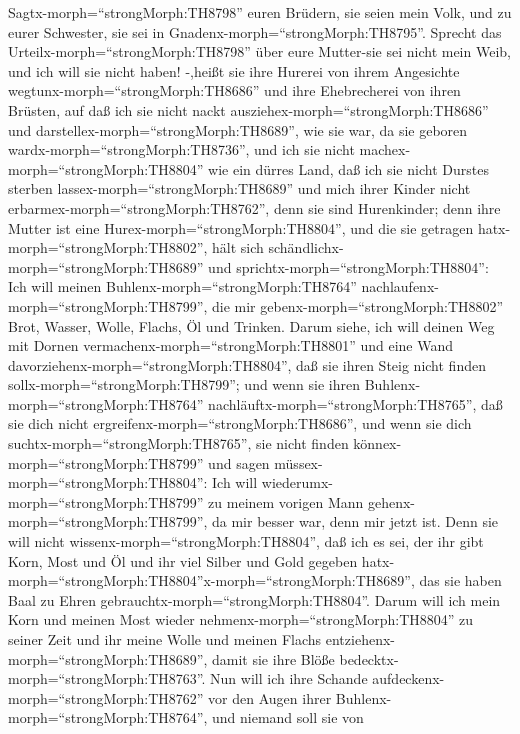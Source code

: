  Sagtx-morph=``strongMorph:TH8798'' euren Brüdern, sie seien
mein Volk, und zu eurer Schwester, sie sei in
Gnadenx-morph=``strongMorph:TH8795''.  Sprecht das
Urteilx-morph=``strongMorph:TH8798'' über eure Mutter-sie sei nicht mein
Weib, und ich will sie nicht haben! -,heißt sie ihre Hurerei von ihrem
Angesichte wegtunx-morph=``strongMorph:TH8686'' und ihre Ehebrecherei
von ihren Brüsten,  auf daß ich sie nicht nackt
ausziehex-morph=``strongMorph:TH8686'' und
darstellex-morph=``strongMorph:TH8689'', wie sie war, da sie geboren
wardx-morph=``strongMorph:TH8736'', und ich sie nicht
machex-morph=``strongMorph:TH8804'' wie ein dürres Land, daß ich sie
nicht Durstes sterben lassex-morph=``strongMorph:TH8689'' 
und mich ihrer Kinder nicht erbarmex-morph=``strongMorph:TH8762'', denn
sie sind Hurenkinder;  denn ihre Mutter ist eine
Hurex-morph=``strongMorph:TH8804'', und die sie getragen
hatx-morph=``strongMorph:TH8802'', hält sich
schändlichx-morph=``strongMorph:TH8689'' und
sprichtx-morph=``strongMorph:TH8804'': Ich will meinen
Buhlenx-morph=``strongMorph:TH8764''
nachlaufenx-morph=``strongMorph:TH8799'', die mir
gebenx-morph=``strongMorph:TH8802'' Brot, Wasser, Wolle, Flachs, Öl und
Trinken.  Darum siehe, ich will deinen Weg mit Dornen
vermachenx-morph=``strongMorph:TH8801'' und eine Wand
davorziehenx-morph=``strongMorph:TH8804'', daß sie ihren Steig nicht
finden sollx-morph=``strongMorph:TH8799'';  und wenn sie
ihren Buhlenx-morph=``strongMorph:TH8764''
nachläuftx-morph=``strongMorph:TH8765'', daß sie dich nicht
ergreifenx-morph=``strongMorph:TH8686'', und wenn sie dich
suchtx-morph=``strongMorph:TH8765'', sie nicht finden
könnex-morph=``strongMorph:TH8799'' und sagen
müssex-morph=``strongMorph:TH8804'': Ich will
wiederumx-morph=``strongMorph:TH8799'' zu meinem vorigen Mann
gehenx-morph=``strongMorph:TH8799'', da mir besser war, denn mir jetzt
ist.  Denn sie will nicht
wissenx-morph=``strongMorph:TH8804'', daß ich es sei, der ihr gibt Korn,
Most und Öl und ihr viel Silber und Gold gegeben
hatx-morph=``strongMorph:TH8804''x-morph=``strongMorph:TH8689'', das sie
haben Baal zu Ehren gebrauchtx-morph=``strongMorph:TH8804''.
 Darum will ich mein Korn und meinen Most wieder
nehmenx-morph=``strongMorph:TH8804'' zu seiner Zeit und ihr meine Wolle
und meinen Flachs entziehenx-morph=``strongMorph:TH8689'', damit sie
ihre Blöße bedecktx-morph=``strongMorph:TH8763''.  Nun will
ich ihre Schande aufdeckenx-morph=``strongMorph:TH8762'' vor den Augen
ihrer Buhlenx-morph=``strongMorph:TH8764'', und niemand soll sie von

